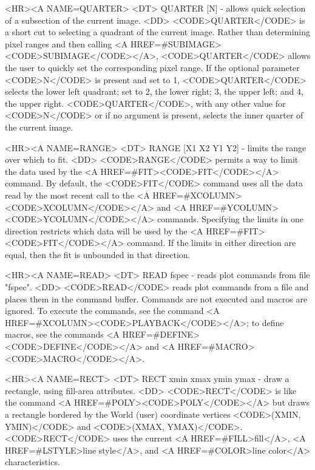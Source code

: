 \begin{rawhtml}
<HR><A NAME=QUARTER>
<DT>
QUARTER [N] - allows quick selection of a subsection of the current image.
<DD>
	<CODE>QUARTER</CODE> is a short cut to selecting a quadrant of
	the current image.  Rather than determining pixel ranges and
	then calling <A HREF=#SUBIMAGE><CODE>SUBIMAGE</CODE></A>,
	<CODE>QUARTER</CODE> allows the user to quickly set the
	corresponding pixel range.  If the optional parameter <CODE>N</CODE>
	is present and set to 1, <CODE>QUARTER</CODE> selects the lower
	left quadrant; set to 2, the lower right; 3, the upper left;
	and 4, the upper right.  <CODE>QUARTER</CODE>, with any other
	value for <CODE>N</CODE> or if no argument is present, selects
	the inner quarter of the current image.

<HR><A NAME=RANGE>
<DT>
RANGE [X1 X2 Y1 Y2] - limits the range over which to fit.
<DD>
	<CODE>RANGE</CODE> permits a way to limit the data used by the
	<A HREF=#FIT><CODE>FIT</CODE></A> command.  By default, the
	<CODE>FIT</CODE> command uses all the data read by the most
	recent call to the <A HREF=#XCOLUMN><CODE>XCOLUMN</CODE></A>
	and <A HREF=#YCOLUMN><CODE>YCOLUMN</CODE></A> commands.
	Specifying the limits in one direction restricts which data
	will be used by the <A HREF=#FIT><CODE>FIT</CODE></A> command.
	If the limits in either direction are equal, then the fit is
	unbounded in that direction.

<HR><A NAME=READ>
<DT>
READ fspec - reads plot commands from file "fspec".
<DD>
	<CODE>READ</CODE> reads plot commands from a file and places
	them in the command buffer.  Commands are not executed and macros
	are ignored.  To execute the commands, see the command
	<A HREF=#XCOLUMN><CODE>PLAYBACK</CODE></A>; to define macros,
	see the commands <A HREF=#DEFINE><CODE>DEFINE</CODE></A> and
	<A HREF=#MACRO><CODE>MACRO</CODE></A>.

<HR><A NAME=RECT>
<DT>
RECT xmin xmax ymin ymax - draw a rectangle, using fill-area attributes.
<DD>
	<CODE>RECT</CODE> is like the command
	<A HREF=#POLY><CODE>POLY</CODE></A> but draws a
	rectangle bordered by the World (user) coordinate vertices
	<CODE>(XMIN, YMIN)</CODE> and <CODE>(XMAX, YMAX)</CODE>.
	<CODE>RECT</CODE> uses the current
	<A HREF=#FILL>fill</A>, <A HREF=#LSTYLE>line style</A>, and
	<A HREF=#COLOR>line color</A> characteristics.


\end{rawhtml}
